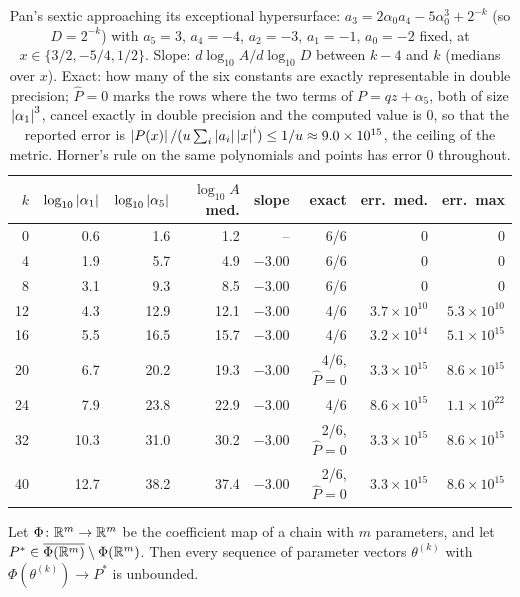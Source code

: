\begin{table}[htbp]
\centering\footnotesize
\begin{tabular}{@{}rrrrrrrr@{}}
\toprule
$k$ & $\log_{10}\left\lvert \alpha_1\right\rvert$ & $\log_{10}\left\lvert \alpha_5\right\rvert$ & $\log_{10}A$ med. & slope & exact & err.\ med. & err.\ max \\
\midrule
0 & 0.6 & 1.6 & 1.2 & $\text{--}$ & 6/6 & $0$ & $0$ \\
4 & 1.9 & 5.7 & 4.9 & $-3.00$ & 6/6 & $0$ & $0$ \\
8 & 3.1 & 9.3 & 8.5 & $-3.00$ & 6/6 & $0$ & $0$ \\
12 & 4.3 & 12.9 & 12.1 & $-3.00$ & 4/6 & $3.7\times10^{10}$ & $5.3\times10^{10}$ \\
16 & 5.5 & 16.5 & 15.7 & $-3.00$ & 4/6 & $3.2\times10^{14}$ & $5.1\times10^{15}$ \\
20 & 6.7 & 20.2 & 19.3 & $-3.00$ & 4/6, $\widehat P=0$ & $3.3\times10^{15}$ & $8.6\times10^{15}$ \\
24 & 7.9 & 23.8 & 22.9 & $-3.00$ & 4/6 & $8.6\times10^{15}$ & $1.1\times10^{22}$ \\
32 & 10.3 & 31.0 & 30.2 & $-3.00$ & 2/6, $\widehat P=0$ & $3.3\times10^{15}$ & $8.6\times10^{15}$ \\
40 & 12.7 & 38.2 & 37.4 & $-3.00$ & 2/6, $\widehat P=0$ & $3.3\times10^{15}$ & $8.6\times10^{15}$ \\
\bottomrule
\end{tabular}
\caption{Pan's sextic approaching its exceptional hypersurface:
$a_3=2\alpha_0a_4-5\alpha_0^3+2^{-k}$ (so $D=2^{-k}$) with $a_5=3$, $a_4=-4$,
$a_2=-3$, $a_1=-1$, $a_0=-2$ fixed, at $x\in\{3/2,-5/4,1/2\}$.  Slope:
$d\log_{10}A/d\log_{10}D$ between $k-4$ and $k$ (medians over $x$).  Exact:
how many of the six constants are exactly representable in double precision;
$\widehat P=0$ marks the rows where the two terms of $P=qz+\alpha_5$, both of
size $\left\lvert \alpha_1\right\rvert^3$, cancel exactly in double precision and the computed
value is $0$, so that the reported error is
$\left\lvert P(x)\right\rvert/(u\sum_i\left\lvert a_i\right\rvert\left\lvert x\right\rvert^i)\le1/u\approx9.0\times10^{15}$, the
ceiling of the metric.  Horner's rule on the same polynomials and points has
error $0$ throughout.}
\label{tab:numstab-pan-sweep}
\end{table}

\begin{lemma}
\label{lem:image-boundary}
Let $\Phi\colon\mathbb{R}^m\to\mathbb{R}^m$ be the coefficient map of a chain with $m$
parameters, and let $P^*\in\overline{\Phi(\mathbb{R}^m)}\setminus\Phi(\mathbb{R}^m)$.  Then
every sequence of parameter vectors $\theta^{(k)}$ with
$\Phi(\theta^{(k)})\to P^*$ is unbounded.
\end{lemma}

